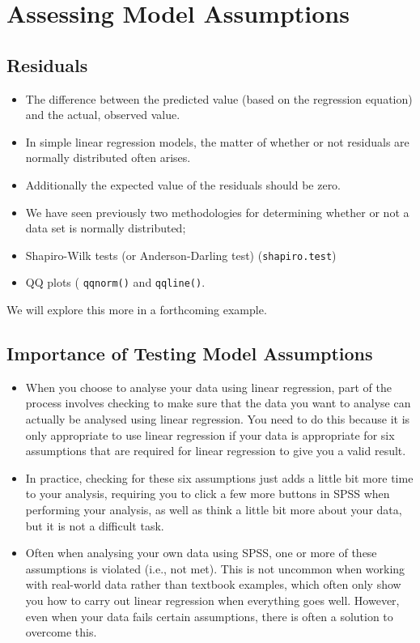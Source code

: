 \documentclass[a4paper,12pt]{article}
\begin{document}




\newpage
\section{Assessing Model Assumptions}
\subsection{Residuals}  
\begin{itemize}
\item The difference between the predicted value (based on the regression equation) and the actual, observed value. 
\item In simple linear regression models, the matter of whether or not residuals are normally distributed often arises.
\item Additionally the expected value of the residuals should be zero.
\item We have seen previously two methodologies for determining whether or not a data set is normally distributed;
\end{itemize}

\begin{itemize} \item 	Shapiro-Wilk tests (or Anderson-Darling test) (\texttt{shapiro.test})
\item 	QQ plots ( \texttt{qqnorm()} and \texttt{qqline()}.
\end{itemize}

We will explore this more in a forthcoming example.
\newpage


\subsection{Importance of Testing Model Assumptions}
\begin{itemize}
\item When you choose to analyse your data using linear regression, part of the process involves checking to make sure that the data you want to analyse can actually be analysed using linear regression. You need to do this because it is only appropriate to use linear regression if your data is appropriate for six assumptions that are required for linear regression to give you a valid result.

\item In practice, checking for these six assumptions just adds a little bit more time to your analysis, requiring you to click a few more buttons in SPSS when performing your analysis, as well as think a little bit more about your data, but it is not a difficult task.

\item Often when analysing your own data using SPSS, one or more of these assumptions is violated (i.e., not met). This is not uncommon when working with real-world data rather than textbook examples, which often only show you how to carry out linear regression when everything goes well. However, even when your data fails certain assumptions, there is often a solution to overcome this. 
\end{itemize}
\end{document}

